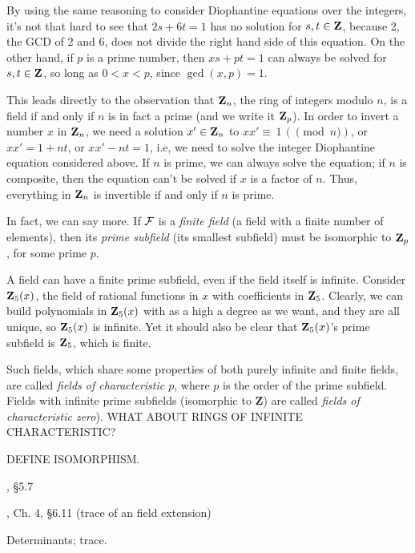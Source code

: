 
By using the same reasoning to consider Diophantine equations over the
integers, it's not that hard to see that $2s+6t=1$ has no solution for
$s,t\in{\bf Z}$, because 2, the GCD of 2 and 6, does not divide the
right hand side of this equation.  On the other hand, if $p$ is a
prime number, then $xs+pt=1$ can always be solved for $s,t\in{\bf Z}$,
so long as $0<x<p$, since $\gcd(x,p)=1$.

This leads directly to the observation that ${\bf Z}_n$, the ring of
integers modulo $n$, is a field if and only if $n$ is in fact a prime
(and we write it ${\bf Z}_p$).  In order to invert a number $x$ in
${\bf Z}_n$, we need a solution $x'\in{\bf Z}_n$ to $xx'\equiv\, 1\,
(\pmod n)$, or $xx' = 1 + nt$, or $xx' - nt = 1$, i.e, we need
to solve the integer Diophantine equation considered above.  If $n$ is
prime, we can always solve the equation; if $n$ is composite, then the
equation can't be solved if $x$ is a factor of $n$.  Thus, everything
in ${\bf Z}_n$ is invertible if and only if $n$ is prime.

In fact, we can say more.  If ${\cal F}$ is a {\it finite field} (a
field with a finite number of elements), then its {\it prime subfield}
(its smallest subfield) must be isomorphic to ${\bf Z}_p$,
for some prime $p$.

A field can have a finite prime subfield, even if the field itself is
infinite.  Consider ${\bf Z}_5(x)$, the field of rational functions in
$x$ with coefficients in ${\bf Z}_5$.  Clearly, we can build
polynomials in ${\bf Z}_5(x)$ with as a high a degree as we want, and
they are all unique, so ${\bf Z}_5(x)$ is infinite.  Yet it
should also be clear that ${\bf Z}_5(x)$'s prime subfield
is ${\bf Z}_5$, which is finite.

Such fields, which share some properties of both purely infinite and
finite fields, are called {\it fields of characteristic $p$}, where
$p$ is the order of the prime subfield.  Fields with infinite prime
subfields (isomorphic to {\bf Z}) are called {\it fields of
characteristic zero}).  WHAT ABOUT RINGS OF INFINITE CHARACTERISTIC?

DEFINE ISOMORPHISM.

, \S5.7

, Ch. 4, \S6.11 (trace of an field extension)

Determinants; trace.

